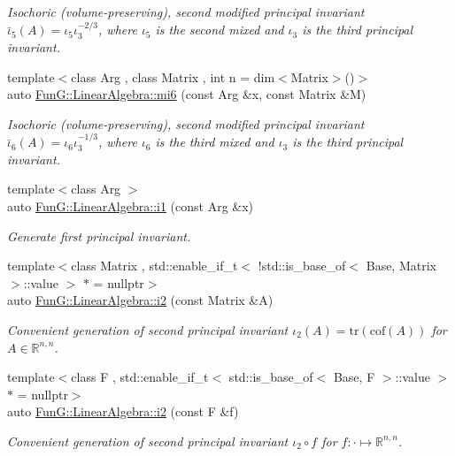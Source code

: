 \begin{DoxyCompactItemize}
\begin{DoxyCompactList}\small\item\em Isochoric (volume-\/preserving), second modified principal invariant $ \bar\iota_5(A)=\iota_5\iota_3^{-2/3} $, where $\iota_5$ is the second mixed and $\iota_3$ is the third principal invariant. \end{DoxyCompactList}\item 
{\footnotesize template$<$class Arg , class Matrix , int n = dim$<$\-Matrix$>$()$>$ }\\auto \hyperlink{group__InvariantGroup_ga3e451f9e15fa95080f81d0c0f69f93e6}{Fun\-G\-::\-Linear\-Algebra\-::mi6} (const Arg \&x, const Matrix \&M)
\begin{DoxyCompactList}\small\item\em Isochoric (volume-\/preserving), second modified principal invariant $ \bar\iota_6(A)=\iota_6\iota_3^{-1/3} $, where $\iota_6$ is the third mixed and $\iota_3$ is the third principal invariant. \end{DoxyCompactList}\item 
{\footnotesize template$<$class Arg $>$ }\\auto \hyperlink{group__InvariantGroup_gafaead59b618d87239270f8eca2bf75c8}{Fun\-G\-::\-Linear\-Algebra\-::i1} (const Arg \&x)
\begin{DoxyCompactList}\small\item\em Generate first principal invariant. \end{DoxyCompactList}\item 
{\footnotesize template$<$class Matrix , std\-::enable\-\_\-if\-\_\-t$<$ !std\-::is\-\_\-base\-\_\-of$<$ Base, Matrix $>$\-::value $>$ $\ast$  = nullptr$>$ }\\auto \hyperlink{group__InvariantGroup_ga9e442bab8f203bcd5634a3d0e65bf802}{Fun\-G\-::\-Linear\-Algebra\-::i2} (const Matrix \&A)
\begin{DoxyCompactList}\small\item\em Convenient generation of second principal invariant $ \iota_2(A)=\mathrm{tr}(\mathrm{cof}(A)) $ for $A\in\mathbb{R}^{n,n}$. \end{DoxyCompactList}\item 
{\footnotesize template$<$class F , std\-::enable\-\_\-if\-\_\-t$<$ std\-::is\-\_\-base\-\_\-of$<$ Base, F $>$\-::value $>$ $\ast$  = nullptr$>$ }\\auto \hyperlink{group__InvariantGroup_gad3987f97353c8696e602ed1915b3cf47}{Fun\-G\-::\-Linear\-Algebra\-::i2} (const F \&f)
\begin{DoxyCompactList}\small\item\em Convenient generation of second principal invariant $ \iota_2\circ f $ for $f:\cdot\mapsto\mathbb{R}^{n,n}$. \end{DoxyCompactList}\item 

\end{DoxyCompactItemize}

